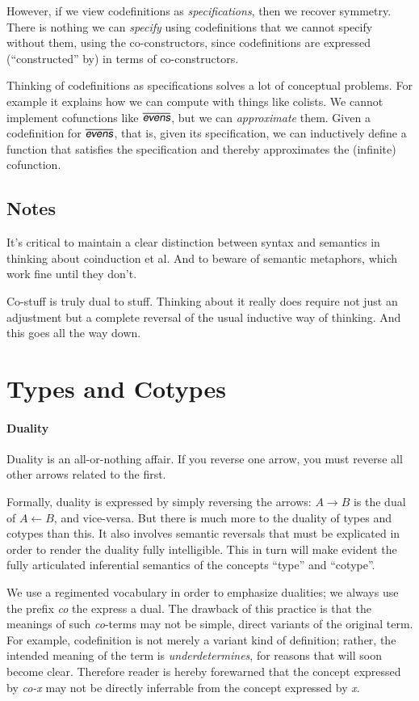 \documentclass{article}
\begin{document}
However, if we view codefinitions as \textit{specifications}, then we
recover symmetry. There is nothing we can \textit{specify} using
codefinitions that we cannot specify without them, using the
co-constructors, since codefinitions are expressed (``constructed''
by) in terms of co-constructors.

Thinking of codefinitions as specifications solves a lot of conceptual
problems. For example it explains how we can compute with things like
colists. We cannot implement cofunctions like \(\codefn{evens}\), but
we can \textit{approximate} them. Given a codefinition for
\(\codefn{evens}\), that is, given its specification, we can
inductively define a function that satisfies the specification and
thereby approximates the (infinite) cofunction.

\subsection{Notes}

It's critical to maintain a clear distinction between syntax and
semantics in thinking about coinduction et al. And to beware of
semantic metaphors, which work fine until they don't.

Co-stuff is truly dual to stuff. Thinking about it really does require
not just an adjustment but a complete reversal of the usual inductive
way of thinking.  And this goes all the way down.

\section{Types and Cotypes}

\paragraph{Duality}  Duality is an all-or-nothing affair. If you reverse one arrow, you must reverse all other arrows related to the first.

Formally, duality is expressed by simply reversing the arrows:
\(A\rightarrow B\) is the dual of \(A\leftarrow B\), and vice-versa.
But there is much more to the duality of types and cotypes than this.
It also involves semantic reversals that must be explicated in order
to render the duality fully intelligible. This in turn will make
evident the fully articulated inferential semantics of the concepts
``type'' and ``cotype''.

We use a regimented vocabulary in order to emphasize dualities; we
always use the prefix \textit{co} the express a dual. The drawback of
this practice is that the meanings of such \textit{co}-terms may not
be simple, direct variants of the original term. For example,
codefinition is not merely a variant kind of definition; rather, the
intended meaning of the term is \textit{underdetermines}, for reasons
that will soon become clear. Therefore reader is hereby forewarned
that the concept expressed by \textit{co-x} may not be directly
inferrable from the concept expressed by \textit{x}.
\end{document}
